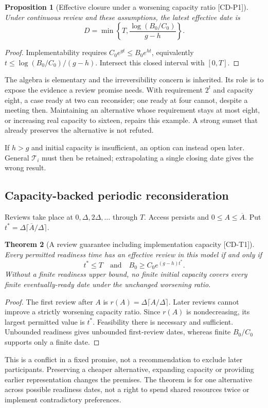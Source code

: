 \documentclass[11pt,a4paper]{article}
\newtheorem{theorem}{Theorem}
\newtheorem{proposition}[theorem]{Proposition}
\theoremstyle{definition}\newtheorem{definition}{Definition}
\newcommand{\tagid}[1]{\textnormal{\textsf{[#1]}}}
\begin{document}
\begin{proposition}[Effective closure under a worsening capacity ratio \tagid{CD-P1}]
Under continuous review and these assumptions, the latest effective date is
\begin{equation}
D=\min\left\{T,\frac{\log(B_0/C_0)}{g-h}\right\}.
\label{eq:effective}
\end{equation}
\end{proposition}
\begin{proof}
Implementability requires $C_0e^{gt}\le B_0e^{ht}$, equivalently $t\le\log(B_0/C_0)/(g-h)$. Intersect this closed interval with $[0,T]$.
\end{proof}
The algebra is elementary and the irreversibility concern is inherited. Its role is to expose the evidence a review promise needs. With requirement $2^t$ and capacity eight, a case ready at two can reconsider; one ready at four cannot, despite a meeting then. Maintaining an alternative whose requirement stays at most eight, or increasing real capacity to sixteen, repairs this example. A strong sunset that already preserves the alternative is not refuted.

If $h>g$ and initial capacity is insufficient, an option can instead open later. General $\mathcal T_i$ must then be retained; extrapolating a single closing date gives the wrong result.

\subsection{Capacity-backed periodic reconsideration}
Reviews take place at $0,\Delta,2\Delta,\ldots$ through $T$. Access persists and $0\le A\le\overline A$. Put $t^*=\Delta\lceil\overline A/\Delta\rceil$.
\begin{theorem}[A review guarantee including implementation capacity \tagid{CD-T1}]
Every permitted readiness time has an effective review in this model if and only if
\begin{equation}
\boxed{t^*\le T\quad\text{and}\quad B_0\ge C_0e^{(g-h)t^*}.}
\label{eq:periodic}
\end{equation}
Without a finite readiness upper bound, no finite initial capacity covers every finite eventually-ready date under the unchanged worsening ratio.
\end{theorem}
\begin{proof}
The first review after $A$ is $r(A)=\Delta\lceil A/\Delta\rceil$. Later reviews cannot improve a strictly worsening capacity ratio. Since $r(A)$ is nondecreasing, its largest permitted value is $t^*$. Feasibility there is necessary and sufficient. Unbounded readiness gives unbounded first-review dates, whereas finite $B_0/C_0$ supports only a finite date.
\end{proof}
This is a conflict in a fixed promise, not a recommendation to exclude later participants. Preserving a cheaper alternative, expanding capacity or providing earlier representation changes the premises. The theorem is for one alternative across possible readiness dates, not a right to spend shared resources twice or implement contradictory preferences.
\end{document}
